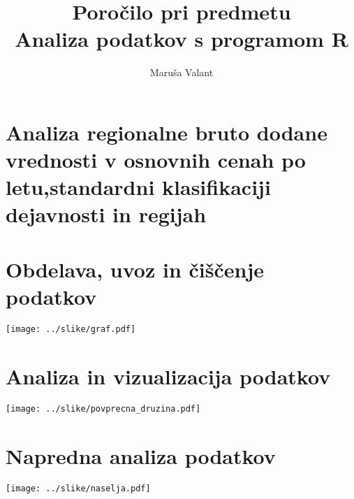 \documentclass[11pt,a4paper]{article}
\begin{document}
\title{Poročilo pri predmetu \\
Analiza podatkov s programom R}
\author{Maruša Valant}
\maketitle

\section{Analiza regionalne bruto dodane vrednosti v osnovnih cenah po letu,standardni klasifikaciji dejavnosti in regijah} 

\section{Obdelava, uvoz in čiščenje podatkov}



\texttt{[image: ../slike/graf.pdf]}

\section{Analiza in vizualizacija podatkov}

\texttt{[image: ../slike/povprecna\_druzina.pdf]}

\section{Napredna analiza podatkov}

\texttt{[image: ../slike/naselja.pdf]}
\end{document}
